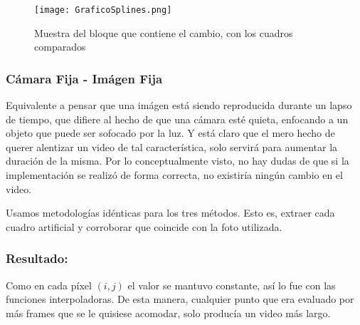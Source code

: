 \begin{figure}[h!]
  \centering
    \texttt{[image: GraficoSplines.png]}
     \caption{Muestra del bloque que contiene el cambio, con los cuadros comparados}\label{fig:splineValidacion}
\end{figure}
\noindent

\subsubsection{C\'amara Fija - Im\'agen Fija}

Equivalente a pensar que una im\'agen est\'a siendo reproducida durante un lapso de tiempo, que difiere al hecho de que una c\'amara est\'e quieta, enfocando a un objeto que puede ser sofocado por la luz. Y est\'a claro que el mero hecho de querer alentizar un video de tal caracter\'istica, solo servir\'a para aumentar la duraci\'on de la misma. Por lo conceptualmente visto, no hay dudas de que si la implementaci\'on se realiz\'o de forma correcta, no existir\'ia ning\'un cambio en el video.

Usamos metodolog\'ias id\'enticas para los tres m\'etodos. Esto es, extraer cada cuadro artificial y corroborar que coincide con la foto utilizada.

\subsubsection*{\bf{Resultado:}}

Como en cada p\'ixel $(i,j)$ el valor se mantuvo constante, as\'i lo fue con las funciones interpoladoras. De esta manera, cualquier punto que era evaluado por m\'as frames que se le quisiese acomodar, solo produc\'ia un video m\'as largo.
